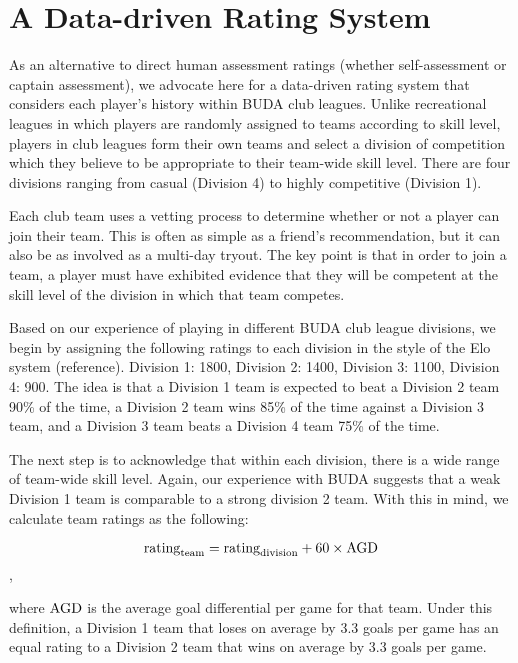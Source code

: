 \section{A Data-driven Rating System}\label{sec:club_rating}

As an alternative to direct human assessment ratings (whether self-assessment or captain assessment), we advocate here for a data-driven rating system that considers each player's history within BUDA club leagues. Unlike recreational leagues in which players are randomly assigned to teams according to skill level, players in club leagues form their own teams and select a division of competition which they believe to be appropriate to their team-wide skill level.  There are four divisions ranging from casual (Division 4) to highly competitive (Division 1).  

Each club team uses a vetting process to determine whether or not a player can join their team. This is often as simple as a friend's recommendation, but it can also be as involved as a multi-day tryout. The key point is that in order to join a team, a player must have exhibited evidence that they will be competent at the skill level of the division in which that team competes.

Based on our experience of playing in different BUDA club league divisions, we begin by assigning the following ratings to each division in the style of the Elo system (reference). Division 1: 1800, Division 2: 1400, Division 3: 1100, Division 4: 900.  The idea is that a Division 1 team is expected to beat a Division 2 team 90\% of the time, a Division 2 team wins 85\% of the time against a Division 3 team, and a Division 3 team beats a Division 4 team 75\% of the time.

The next step is to acknowledge that within each division, there is a wide range of team-wide skill level. Again, our experience with BUDA suggests that a weak Division 1 team is comparable to a strong division 2 team.  With this in mind, we calculate team ratings as the following:

\begin{equation}
{\rm rating}_{\rm team} = {\rm rating}_{\rm division} + 60 \times {\rm AGD}
\end{equation},

\noindent where ${\rm AGD}$ is the average goal differential per game for that team.  Under this definition, a Division 1 team that loses on average by 3.3 goals per game has an equal rating to a Division 2 team that wins on average by 3.3 goals per game.

